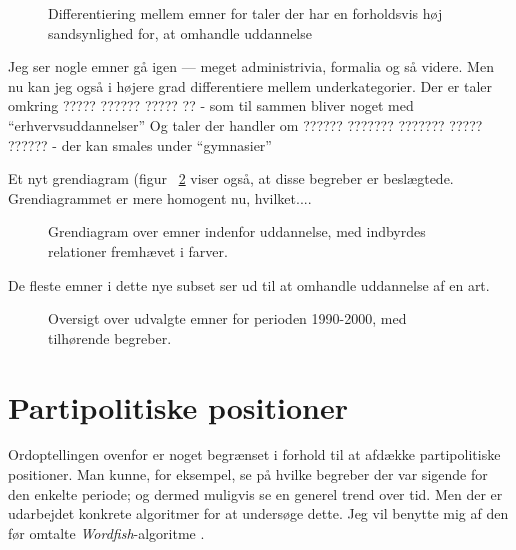 \begin{figure}
  
\caption{Differentiering mellem emner for taler der har en forholdsvis høj sandsynlighed for, at omhandle uddannelse}
\label{fig:models_edu}
\end{figure}

Jeg ser nogle emner gå igen — meget administrivia, formalia og så videre.
Men nu kan jeg også i højere grad differentiere mellem underkategorier.
Der er taler omkring ????? ?????? ????? ??  - som til sammen bliver noget med “erhvervsuddannelser”
Og taler der handler om ?????? ??????? ??????? ????? ?????? - der kan smales under “gymnasier”

Et nyt grendiagram (figur ~\ref{fig:dendro_edu} viser også, at disse begreber er beslægtede.
Grendiagrammet er mere homogent nu, hvilket....


\begin{figure}
 
\caption{Grendiagram over emner indenfor uddannelse, med indbyrdes relationer fremhævet i farver.}
\label{fig:dendro_edu}
\end{figure}


De fleste emner i dette nye subset ser ud til at omhandle uddannelse af en art.

\begin{figure}
\begin{adjustwidth}{-1in}{-1in}
  
\end{adjustwidth}
\caption{Oversigt over udvalgte emner for perioden 1990-2000, med tilhørende begreber.}
\label{fig:termsEdu}
\end{figure}

\section{Partipolitiske positioner}

Ordoptellingen ovenfor er noget begrænset i forhold til at afdække partipolitiske positioner.
Man kunne, for eksempel, se på hvilke begreber der var sigende for den enkelte periode; og dermed muligvis se en generel trend over tid.
Men der er udarbejdet konkrete algoritmer for at undersøge dette.
Jeg vil benytte mig af den før omtalte \textit{Wordfish}-algoritme \autocite{slapinScalingModelEstimating2008}.

